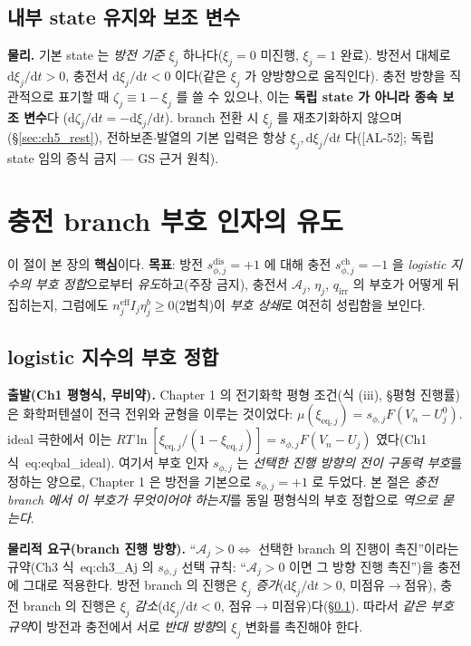 \documentclass[11pt,a4paper]{article}
\newcommand{\dd}{\mathrm{d}}
\newcommand{\eff}{\mathrm{eff}}
\newcommand{\eq}{\mathrm{eq}}
\newcommand{\irr}{\mathrm{irr}}
\newcommand{\dis}{\mathrm{dis}}
\newcommand{\chg}{\mathrm{ch}}
\newcommand{\AL}[1]{\textsf{[AL-#1]}}
\begin{document}
\subsection{내부 state 유지와 보조 변수}\label{sec:ch5_xikeep}
\textbf{물리.} 기본 state 는 \emph{방전 기준} $\xi_j$ 하나다($\xi_j=0$ 미진행, $\xi_j=1$ 완료). 방전서 대체로
$\dd\xi_j/\dd t>0$, 충전서 $\dd\xi_j/\dd t<0$ 이다(같은 $\xi_j$ 가 양방향으로 움직인다). 충전 방향을 직관적으로
표기할 때 $\zeta_j\equiv1-\xi_j$ 를 쓸 수 있으나, 이는 \textbf{독립 state 가 아니라 종속 보조 변수}다
($\dd\zeta_j/\dd t=-\dd\xi_j/\dd t$). branch 전환 시 $\xi_j$ 를 재초기화하지 않으며(\S\ref{sec:ch5_rest}),
전하보존$\cdot$발열의 기본 입력은 항상 $\xi_j,\dd\xi_j/\dd t$ 다(\AL{52}; 독립 state 임의
증식 금지 — GS 근거 원칙).

\section{충전 branch 부호 인자의 유도}\label{sec:ch5_chargesign}
이 절이 본 장의 \textbf{핵심}이다. \textbf{목표}:
방전 $s_{\phi,j}^\dis=+1$ 에 대해 충전 $s_{\phi,j}^\chg=-1$ 을 \emph{logistic 지수의 부호 정합}으로부터
\emph{유도}하고(주장 금지), 충전서 $\mathcal A_j$, $\eta_j$, $q_\irr$ 의 부호가 어떻게 뒤집히는지, 그럼에도
$n_j^{\eff}I_j\eta_j^b\ge0$(2법칙)이 \emph{부호 상쇄}로 여전히 성립함을 보인다.

\subsection{logistic 지수의 부호 정합}\label{sec:ch5_sign_derive}
\textbf{출발(Ch1 평형식, 무비약).} Chapter 1 의 전기화학 평형 조건(식 (iii), \S 평형 진행률)은 화학퍼텐셜이
전극 전위와 균형을 이루는 것이었다: $\mu(\xi_{\eq,j})=s_{\phi,j}F(V_n-U_j^0)$. ideal 극한에서 이는
$RT\ln[\xi_{\eq,j}/(1-\xi_{\eq,j})]=s_{\phi,j}F(V_n-U_j)$ 였다(Ch1 식~eq:eqbal\_ideal). 여기서 부호 인자
$s_{\phi,j}$ 는 \emph{선택한 진행 방향의 전이 구동력 부호}를 정하는 양으로, Chapter 1 은 방전을 기본으로
$s_{\phi,j}=+1$ 로 두었다. 본 절은 \emph{충전 branch 에서 이 부호가 무엇이어야 하는지}를 동일 평형식의 부호
정합으로 \emph{역으로 묻는다}.

\textbf{물리적 요구(branch 진행 방향).} ``$\mathcal A_j>0\Leftrightarrow$ 선택한 branch 의 진행이 촉진''이라는
규약(Ch3 식~eq:ch3\_Aj 의 $s_{\phi,j}$ 선택 규칙: ``$\mathcal A_j>0$ 이면 그 방향 진행 촉진'')을 충전에 그대로
적용한다. 방전 branch 의 진행은 $\xi_j$ \emph{증가}($\dd\xi_j/\dd t>0$, 미점유$\to$점유), 충전 branch 의 진행은
$\xi_j$ \emph{감소}($\dd\xi_j/\dd t<0$, 점유$\to$미점유)다(\S\ref{sec:ch5_xikeep}). 따라서 \emph{같은 부호 규약}이
방전과 충전에서 서로 \emph{반대 방향}의 $\xi_j$ 변화를 촉진해야 한다.
\end{document}
